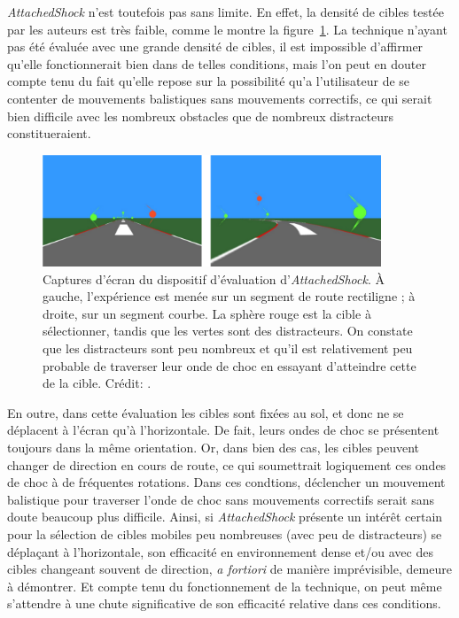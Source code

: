 	\emph{AttachedShock} n'est toutefois pas sans limite. En effet, la densité de cibles testée par les auteurs est très faible, comme le montre la figure~\ref{fig:asDensity}. La technique n'ayant pas été évaluée avec une grande densité de cibles, il est impossible d'affirmer qu'elle fonctionnerait bien dans de telles conditions, mais l'on peut en douter compte tenu du fait qu'elle repose sur la possibilité qu'a l'utilisateur de se \og contenter \fg{} de mouvements balistiques sans mouvements correctifs, ce qui serait bien difficile avec les nombreux obstacles que de nombreux distracteurs constitueraient.
	
	\begin{figure}[!htb]
		\centering
		\includegraphics[width=0.9\textwidth]{figures/ch2/asDensity}
		\caption[\emph{AttachedShock}, densité de cibles]{Captures d'écran du dispositif d'évaluation d'\emph{AttachedShock}. À gauche, l'expérience est menée sur un segment de route rectiligne ; à droite, sur un segment courbe. La sphère rouge est la cible à sélectionner, tandis que les vertes sont des distracteurs. On constate que les distracteurs sont peu nombreux et qu'il est relativement peu probable de \og traverser \fg{} leur onde de choc en essayant d'atteindre cette de la cible. Crédit: \cite{you2012attachedshock}.}
		\label{fig:asDensity}
	\end{figure}
	
	En outre, dans cette évaluation les cibles sont fixées au sol, et donc ne se déplacent à l'écran qu'à l'horizontale. De fait, leurs ondes de choc se présentent toujours dans la même orientation. Or, dans bien des cas, les cibles peuvent changer de direction en cours de route, ce qui soumettrait logiquement ces ondes de choc à de fréquentes rotations. Dans ces condtions, déclencher un mouvement balistique pour traverser l'onde de choc sans mouvements correctifs serait sans doute beaucoup plus difficile.	Ainsi, si \emph{AttachedShock} présente un intérêt certain pour la sélection de cibles mobiles peu nombreuses (avec peu de distracteurs) se déplaçant à l'horizontale, son efficacité en environnement dense et/ou avec des cibles changeant souvent de direction, \emph{a fortiori} de manière imprévisible, demeure à démontrer. Et compte tenu du fonctionnement de la technique, on peut même s'attendre à une chute significative de son efficacité relative dans ces conditions.	
	
